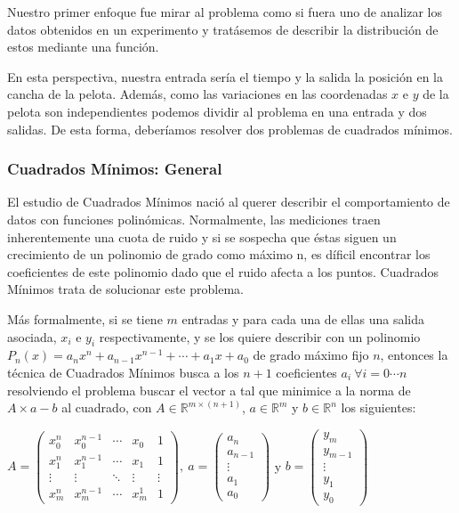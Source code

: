 
Nuestro primer enfoque fue mirar al problema como si fuera uno de analizar los datos obtenidos en un
experimento y tratásemos de describir la distribución de estos mediante una función.

En esta perspectiva, nuestra entrada sería el tiempo y la salida la posición en la cancha de la
pelota. Además, como las variaciones en las coordenadas $x$ e $y$ de la pelota son independientes
podemos dividir al problema en una entrada y dos salidas. De esta forma, deberíamos resolver dos
problemas de cuadrados mínimos.

\subsubsection{Cuadrados Mínimos: General}
El estudio de Cuadrados Mínimos nació al querer describir el comportamiento de datos con funciones
polinómicas. Normalmente, las mediciones traen inherentemente una cuota de ruido y si se sospecha
que éstas siguen un crecimiento de un polinomio de grado como máximo n, es díficil encontrar los
coeficientes de este polinomio dado que el ruido afecta a los puntos. Cuadrados Mínimos trata de
solucionar este problema.

Más formalmente, si se tiene $m$ entradas y para cada una de ellas una salida asociada, $x_i$ e
$y_i$ respectivamente, y se los quiere describir con un polinomio $P_n(x) = a_n x^n+a_{n-1}x^{n-1} +
\cdots + a_1x + a_0$ de grado máximo fijo $n$, entonces la técnica de Cuadrados Mínimos busca a los
$n+1$ coeficientes $a_i \ \forall i=0\cdots n$ resolviendo el problema buscar el vector a tal que
minimice a la norma de $A \times a - b$ al cuadrado, con $A \in \mathbb{R}^{m\times (n+1)}$,
$a \in \mathbb{R}^m$ y $b \in \mathbb{R}^n$ los siguientes:

  $ A = \begin{pmatrix}
    x_0^n & x_0^{n-1} & \cdots &  x_0  & 1 \\
    x_1^{n} & x_1^{n-1} & \cdots & x_1 & 1 \\
    \vdots  & \vdots  & \ddots & \vdots  & \vdots \\
    x_m^{n} & x_m^{n-1} & \cdots & x_m^1 & 1
              \end{pmatrix}, \ 
   a = \begin{pmatrix}
        a_n \\
        a_{n-1} \\
        \vdots \\
        a_1 \\
        a_0
       \end{pmatrix}
  $ y $
  b = \begin{pmatrix}
        y_m \\
        y_{m-1} \\
        \vdots \\
        y_1 \\
        y_0
       \end{pmatrix}
  $

